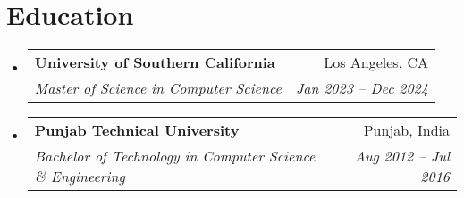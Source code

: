 \documentclass[letterpaper,11pt]{article}
\makeatletter
\newcommand{\resumeSubheading}[4]{
  \vspace{-1pt}\item
    \begin{tabular*}{0.97\textwidth}[t]{l@{\extracolsep{\fill}}r}
      \textbf{#1} & #2 \\
      \textit{\small#3} & \textit{\small #4} \\
    \end{tabular*}\vspace{-5pt}
}
\newcommand{\resumeSubHeadingListStart}{\begin{itemize}[leftmargin=*]}
\newcommand{\resumeSubHeadingListEnd}{\end{itemize}}
\makeatother
\begin{document}
\section{Education}
\resumeSubHeadingListStart
  \resumeSubheading
    {University of Southern California}{Los Angeles, CA}
    {Master of Science in Computer Science}{Jan 2023 -- Dec 2024}
  \resumeSubheading
    {Punjab Technical University}{Punjab, India}
    {Bachelor of Technology in Computer Science \& Engineering}{Aug 2012 -- Jul 2016}
\resumeSubHeadingListEnd

\end{document}
